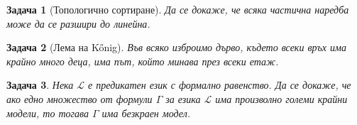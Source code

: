 \documentclass[12pt]{article}
\newcommand{\calL}{\mathcal{L}}
\newtheorem{problem}{Задача}[section]
\theoremstyle{definition}
\theoremstyle{remark}
\begin{document}
\begin{problem}[Топологично сортиране]
Да се докаже, че всяка частична наредба може да се разшири до линейна.
\end{problem}

\begin{problem}[Лема на Kőnig]
Във всяко изброимо дърво, където всеки връх има крайно много деца, има път, който минава през всеки етаж.
\end{problem}

\begin{problem}
Нека $\calL$ е предикатен език с формално равенство.
Да се докаже, че ако едно множество от формули $\Gamma$ за езика $\calL$ има произволно големи крайни модели, то тогава $\Gamma$ има безкраен модел.
\end{problem}
\end{document}
